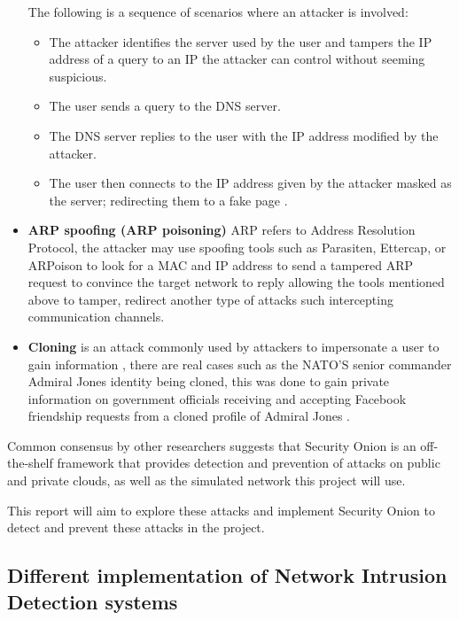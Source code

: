 \documentclass[12pt]{article}
\begin{document}
\begin{itemize}
		The following is a sequence of scenarios where an attacker is involved:
		\begin{itemize}
			\item The attacker identifies the server used by the user and tampers the IP address of a query to an IP the attacker can control without seeming suspicious.
			\item The user sends a query to the DNS server.
			
			\item The DNS server replies to the user with the IP address modified by the attacker.
			
			\item The user then connects to the IP address given by the attacker masked as the server; redirecting them to a fake page \cite{babu_2010_comprehensive}.	 
		\end{itemize}
		
		
		
		
		
		\item  \textbf{ARP spoofing (ARP poisoning)} ARP refers to Address Resolution Protocol, the attacker may use spoofing tools such as Parasiten, Ettercap, or ARPoison to look for a MAC and IP address to send a tampered ARP request to convince the target network to reply allowing the tools mentioned above to tamper, redirect another type of attacks such intercepting communication channels. 
		
		\item \textbf{Cloning} is an attack commonly used by attackers to impersonate a user to gain information \cite{hindy_2020_taxonomy}, there are real cases such as the NATO'S senior commander Admiral Jones identity being cloned, this was done to gain private information on government officials receiving and accepting  Facebook friendship requests from a cloned profile of Admiral Jones \cite{fire_2014_online}.
	\end{itemize}
	
	Common consensus by other researchers suggests that Security Onion is an off-the-shelf framework that provides detection and prevention of attacks on public and private clouds, as well as the simulated network this project will use.
	
	This report will aim to explore these attacks and implement Security Onion to detect and prevent these attacks in the project.
	
	
		
		
		
		\subsection{Different implementation of Network Intrusion Detection systems }
		
\end{document}
